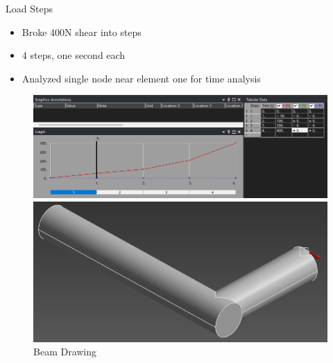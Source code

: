 \documentclass[11pt]{beamer}
\begin{document}
    \begin{frame}{Load Steps} 
        \begin{itemize}
            \item Broke 400N shear into steps
            \item 4 steps, one second each
            \item Analyzed single node near element one for time analysis
        \end{itemize}

        \begin{figure}[H]
            \begin{minipage}{.5\textwidth}
                \centering
                \hspace{-15pt}
                \includegraphics[height=0.4\textwidth]{figs/3E-3_Body_1E-3_Face/step_loading_graph_cropped.png}
            \end{minipage}%
            \begin{minipage}{.5\textwidth}
                \centering
                \hspace{15pt}
                \includegraphics[height=0.4\textwidth]{figs/3E-3_Body_1E-3_Face/step_force_location_cropped.png}
            \end{minipage}
            \caption{Beam Drawing}
        \end{figure}
    \end{frame}
\end{document}
